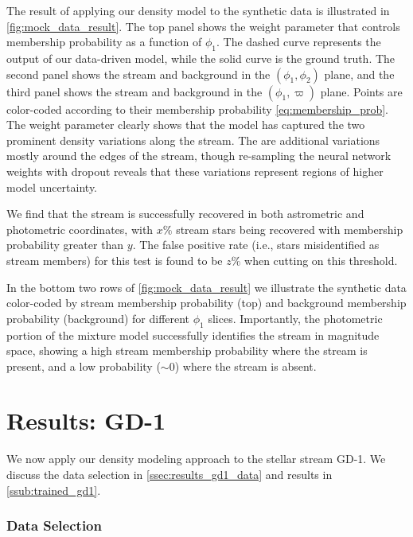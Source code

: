 \documentclass[twocolumn]{aastex631}
\newcommand{\parallax}{\varpi}
\begin{document}
    
        The result of applying our density model to the synthetic data is illustrated in \autoref{fig:mock_data_result}. The top panel shows the weight parameter that controls membership probability as a function of $\phi_1$. The dashed curve represents the output of our data-driven model, while the solid curve is the ground truth. The second panel shows the stream and background in the $(\phi_1,\phi_2)$ plane, and the third panel shows the stream and background in the $(\phi_1,\parallax)$ plane. Points are color-coded according to their membership probability \autoref{eq:membership_prob}. The weight parameter clearly shows that the model has captured the two prominent density variations along the stream. The are additional variations  mostly around the edges of the stream, though re-sampling the neural network weights with dropout reveals that these variations represent regions of higher model uncertainty. 
        
        We find that the stream is successfully recovered in both astrometric and photometric coordinates, with $x\%$ stream stars being recovered with membership probability greater than $y$. The false positive rate (i.e., stars misidentified as stream members) for this test is found to be $z\%$ when cutting on this threshold. 
    
        In the bottom two rows of \autoref{fig:mock_data_result} we illustrate the synthetic data color-coded by stream membership probability (top) and background membership probability (background) for different $\phi_1$ slices. Importantly, the photometric portion of the mixture model successfully identifies the stream in magnitude space, showing a high stream membership probability where the stream is present, and a low probability ($\sim 0$) where the stream is absent.  
    

\section{Results: GD-1} \label{sec:results_gd1}

        We now apply our density modeling approach to the stellar stream GD-1. We discuss the data selection in \autoref{ssec:results_gd1_data} and results in \autoref{ssub:trained_gd1}.
        
        \subsubsection{Data Selection} \label{ssec:results_gd1_data}
\end{document}
